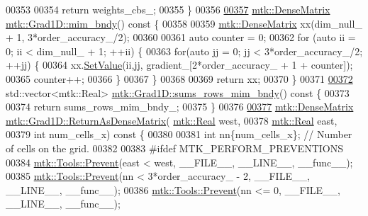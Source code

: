 \begin{DoxyCode}
{{00353 
00354   \textcolor{keywordflow}{return} weights\_cbs\_;
00355 \}
00356 
\hypertarget{mtk__grad__1d_8cc_source_l00357}{}\hyperlink{classmtk_1_1Grad1D_ab25e1d064a5a00fbe3777e65fd5750c0}{00357} \hyperlink{classmtk_1_1DenseMatrix}{mtk::DenseMatrix} \hyperlink{classmtk_1_1Grad1D_ab25e1d064a5a00fbe3777e65fd5750c0}{mtk::Grad1D::mim\_bndy}()\textcolor{keyword}{ const }\{
00358 
00359   \hyperlink{classmtk_1_1DenseMatrix}{mtk::DenseMatrix} xx(dim\_null\_ + 1, 3*order\_accuracy\_/2);
00360 
00361   \textcolor{keyword}{auto} counter = 0;
00362   \textcolor{keywordflow}{for} (\textcolor{keyword}{auto} ii = 0; ii < dim\_null\_ + 1; ++ii) \{
00363     \textcolor{keywordflow}{for}(\textcolor{keyword}{auto} jj = 0; jj < 3*order\_accuracy\_/2; ++jj) \{
00364       xx.\hyperlink{classmtk_1_1DenseMatrix_a784ce5784109ac86bfb9d8562b334b13}{SetValue}(ii,jj, gradient\_[2*order\_accuracy\_ + 1 + counter]);
00365       counter++;
00366     \}
00367   \}
00368 
00369   \textcolor{keywordflow}{return} xx;
00370 \}
00371 
\hypertarget{mtk__grad__1d_8cc_source_l00372}{}\hyperlink{classmtk_1_1Grad1D_ab1c580e5e7f6fad9a0f643b48d3e0e55}{00372} std::vector<mtk::Real> \hyperlink{classmtk_1_1Grad1D_ab1c580e5e7f6fad9a0f643b48d3e0e55}{mtk::Grad1D::sums\_rows\_mim\_bndy}()\textcolor{keyword}{ const }\{
00373 
00374   \textcolor{keywordflow}{return} sums\_rows\_mim\_bndy\_;
00375 \}
00376 
\hypertarget{mtk__grad__1d_8cc_source_l00377}{}\hyperlink{classmtk_1_1Grad1D_a77b2eddbe4ab03f469306c604d505b1a}{00377} \hyperlink{classmtk_1_1DenseMatrix}{mtk::DenseMatrix} \hyperlink{classmtk_1_1Grad1D_a77b2eddbe4ab03f469306c604d505b1a}{mtk::Grad1D::ReturnAsDenseMatrix}(
      \hyperlink{group__c01-roots_gac080bbbf5cbb5502c9f00405f894857d}{mtk::Real} west,
00378                                                   \hyperlink{group__c01-roots_gac080bbbf5cbb5502c9f00405f894857d}{mtk::Real} east,
00379                                                   \textcolor{keywordtype}{int} num\_cells\_x)\textcolor{keyword}{ const }\{
00380 
00381   \textcolor{keywordtype}{int} nn\{num\_cells\_x\}; \textcolor{comment}{// Number of cells on the grid.}
00382 
00383 \textcolor{preprocessor}{  #ifdef MTK\_PERFORM\_PREVENTIONS}
00384   \hyperlink{classmtk_1_1Tools_a332324c6f25e66be9dff48c5987a3b9f}{mtk::Tools::Prevent}(east < west, \_\_FILE\_\_, \_\_LINE\_\_, \_\_func\_\_);
00385   \hyperlink{classmtk_1_1Tools_a332324c6f25e66be9dff48c5987a3b9f}{mtk::Tools::Prevent}(nn < 3*order\_accuracy\_ - 2, \_\_FILE\_\_, \_\_LINE\_\_, \_\_func\_\_);
00386   \hyperlink{classmtk_1_1Tools_a332324c6f25e66be9dff48c5987a3b9f}{mtk::Tools::Prevent}(nn <= 0, \_\_FILE\_\_, \_\_LINE\_\_, \_\_func\_\_);
}}
\end{DoxyCode}
